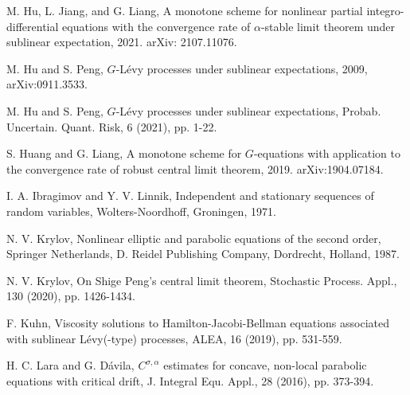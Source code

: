 \documentclass[a4paper,oneside,10pt]{article}%
\numberwithin{equation}{section}
\begin{document}
\begin{thebibliography}{99}








M. Hu, L. Jiang, and G. Liang, A monotone scheme for
nonlinear partial integro-differential equations with the convergence rate of
$\alpha$-stable limit theorem under sublinear expectation, 2021. arXiv: 2107.11076.

M. Hu and S. Peng, $G$-L\'{e}vy processes under sublinear
expectations, 2009, arXiv:0911.3533.

M. Hu and S. Peng, $G$-L\'{e}vy processes under sublinear
expectations, Probab. Uncertain. Quant. Risk, 6 (2021), pp. 1-22.

S. Huang and G. Liang, A monotone scheme for $G$-equations
with application to the convergence rate of robust central limit theorem,
2019. arXiv:1904.07184.

I. A. Ibragimov and Y. V. Linnik, Independent and stationary
sequences of random variables, Wolters-Noordhoff, Groningen, 1971.

N. V. Krylov, Nonlinear elliptic and parabolic equations
of the second order, Springer Netherlands, D. Reidel Publishing Company,
Dordrecht, Holland, 1987.

N. V. Krylov, On Shige Peng's central limit theorem,
Stochastic Process. Appl., 130 (2020), pp. 1426-1434.

F. Kuhn, Viscosity solutions to Hamilton-Jacobi-Bellman
equations associated with sublinear L\'{e}vy(-type) processes, ALEA, 16
(2019), pp. 531-559.

H. C. Lara and G. D\'{a}vila, $C^{\sigma,\alpha}$ estimates
for concave, non-local parabolic equations with critical drift, J. Integral
Equ. Appl., 28 (2016), pp. 373-394.


\end{thebibliography}
\end{document}
